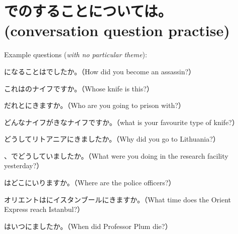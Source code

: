 \documentclass[44pt, oneside]{article}   	%
\begin{document}
\section*{\protect {}でのすることについては。(conversation question practise)}

Example questions (\textit{with no particular theme}):

になることはでしたか。（How did you become an assassin?）

これはのナイフですか。（Whose knife is this?）

だれとにきますか。（Who are you going to prison with?）

どんなナイフがきなナイフですか。（what is your favourite type of knife?）

どうしてリトアニアにきましたか。（Why did you go to Lithuania?）

、でどうしていましたか。（What were you doing in the research facility yesterday?）

はどこにいりますか。（Where are the police officers?）

オリエントはにイスタンブールにきますか。（What time does the Orient Express reach Istanbul?）

はいつにましたか。（When did Professor Plum die?）
\end{document}
